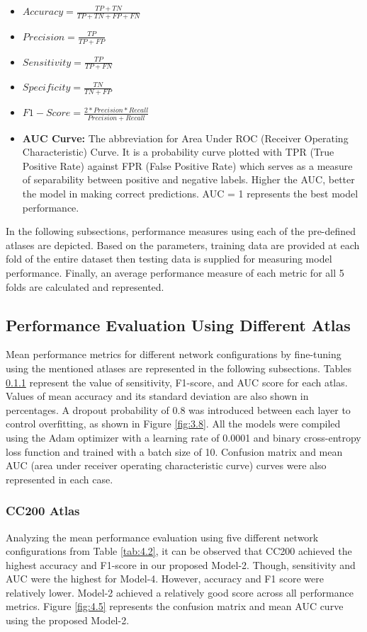 \begin{itemize}
\item $Accuracy=\frac{TP+TN}{TP+TN+FP+FN}$
\item $Precision=\frac{TP}{TP+FP}$
\item $Sensitivity=\frac{TP}{TP+FN}$
\item $Specificity=\frac{TN}{TN+FP}$
\item $F1-Score=\frac{2*Precision*Recall}{Precision+Recall}$
\item \textbf{AUC Curve:} The abbreviation for Area Under ROC (Receiver Operating
Characteristic) Curve. It is a probability curve plotted with TPR (True Positive Rate) against
FPR (False Positive Rate) which serves as a measure of separability between positive and
negative labels. Higher the AUC, better the model in making correct predictions. AUC = 1
represents the best model performance.\\
\end{itemize}

In the following subsections, performance measures using each of the pre-defined atlases
are depicted. Based on the parameters, training data are provided at each fold of the entire
dataset then testing data is supplied for measuring model performance. Finally, an
average performance measure of each metric for all 5 folds are calculated and
represented.

\subsection{Performance Evaluation Using Different Atlas}

Mean performance metrics for different network configurations by fine-tuning using the mentioned atlases are represented in the following subsections. Tables \ref{} represent the value of sensitivity, F1-score, and AUC score for each atlas. Values of mean accuracy and its standard deviation are also shown in percentages. A dropout probability of 0.8 was introduced between each layer to control overfitting, as shown in Figure \ref{fig:3.8}. All the models were compiled using the Adam optimizer with a learning rate of 0.0001 and binary cross-entropy loss function and trained with a batch size of 10. Confusion matrix and mean AUC (area under receiver operating characteristic curve) curves were also represented in each case.

\subsubsection{CC200 Atlas}
Analyzing the mean performance evaluation using five different network configurations from Table \ref{tab:4.2}, it can be observed that CC200 achieved the highest accuracy and F1-score in our proposed Model-2. Though, sensitivity and AUC were the highest for Model-4. However, accuracy and F1 score were relatively lower. Model-2 achieved a relatively good score across all performance metrics. Figure \ref{fig:4.5} represents the confusion matrix and mean AUC curve using the proposed Model-2.

